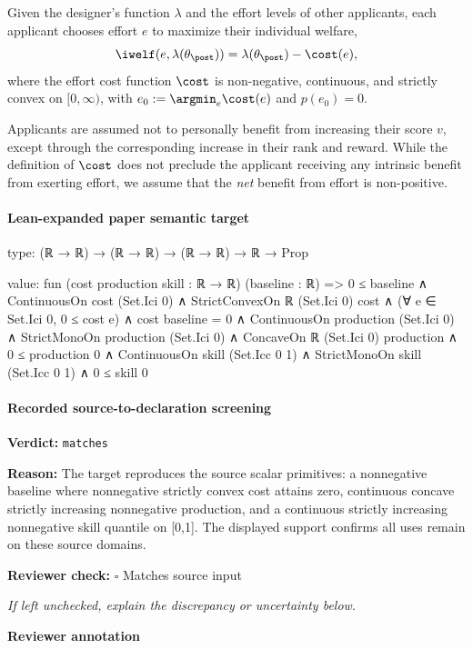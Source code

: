 \documentclass[10pt]{article}
\newcommand{\reviewerbox}{%
  \par\noindent\fbox{\parbox{0.96\linewidth}{\rule{0pt}{0.38in}}}\par
}
\newcommand{\reviewmatch}[1]{%
  \par\noindent\textbf{Reviewer check:} $\square$\; #1\par
  \noindent\emph{If left unchecked, explain the discrepancy or uncertainty below.}\par
}
\begin{document}
\begin{ReviewVerbatim}

 Given the designer's function $\lambda$ and the effort levels of other applicants, each applicant chooses effort $e$ to maximize their individual welfare, %
\begin{equation*}
	\iwelf(e, \lambda(\theta_\post)) = \lambda(\theta_\post) - \cost(e),
\end{equation*}
where the effort cost function $\cost$ is non-negative, continuous, and strictly convex {on $[0,\infty)$, with $e_0:=\argmin_e \cost(e)$ and $p(e_0) = 0$.}

Applicants are assumed not to personally benefit from increasing their score $v$, except through the corresponding increase in their rank and reward. While the definition of $\cost$ does not preclude the applicant receiving any intrinsic benefit from exerting effort, we assume that the \emph{net} benefit from effort is non-positive.
\end{ReviewVerbatim}



\paragraph{Lean-expanded paper semantic target}
\begin{ReviewVerbatim}
type:
(ℝ → ℝ) → (ℝ → ℝ) → (ℝ → ℝ) → ℝ → Prop

value:
fun (cost production skill : ℝ → ℝ) (baseline : ℝ) =>
  0 ≤ baseline ∧
    ContinuousOn cost (Set.Ici 0) ∧
      StrictConvexOn ℝ (Set.Ici 0) cost ∧
        (∀ e ∈ Set.Ici 0, 0 ≤ cost e) ∧
          cost baseline = 0 ∧
            ContinuousOn production (Set.Ici 0) ∧
              StrictMonoOn production (Set.Ici 0) ∧
                ConcaveOn ℝ (Set.Ici 0) production ∧
                  0 ≤ production 0 ∧ ContinuousOn skill (Set.Icc 0 1) ∧ StrictMonoOn skill (Set.Icc 0 1) ∧ 0 ≤ skill 0
\end{ReviewVerbatim}


\paragraph{Recorded source-to-declaration screening}
\textbf{Verdict:} \texttt{matches}
\\
{\raggedright
\textbf{Reason:} The target reproduces the source scalar primitives:\allowbreak{} a nonnegative baseline where nonnegative strictly convex cost attains zero, continuous concave strictly increasing nonnegative production, and a continuous strictly increasing nonnegative skill quantile on [0,1].\allowbreak{} The displayed support confirms all uses remain on these source domains.\allowbreak{}
\par}
\reviewmatch{Matches source input}
\noindent\textbf{Reviewer annotation}\par
\reviewerbox
\clearpage
\hypertarget{paper-prerequisite-2dc31b75c00d0d1b}{}
\end{document}
